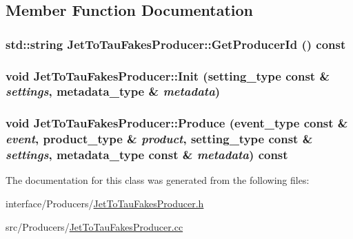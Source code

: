 \subsection{Member Function Documentation}
\hypertarget{classJetToTauFakesProducer_ae37ef82941c16b6b9dd5d8877c3da52e}{
\subsubsection[{GetProducerId}]{\setlength{\rightskip}{0pt plus 5cm}std::string JetToTauFakesProducer::GetProducerId () const}}
\label{classJetToTauFakesProducer_ae37ef82941c16b6b9dd5d8877c3da52e}
\hypertarget{classJetToTauFakesProducer_aee845c60005d5f266e75223e7ba48d0d}{
\subsubsection[{Init}]{\setlength{\rightskip}{0pt plus 5cm}void JetToTauFakesProducer::Init (setting\_\-type const \& {\em settings}, \/  metadata\_\-type \& {\em metadata})}}
\label{classJetToTauFakesProducer_aee845c60005d5f266e75223e7ba48d0d}
\hypertarget{classJetToTauFakesProducer_a15c8ffdd745fe71abbf163536b8b231e}{
\subsubsection[{Produce}]{\setlength{\rightskip}{0pt plus 5cm}void JetToTauFakesProducer::Produce (event\_\-type const \& {\em event}, \/  product\_\-type \& {\em product}, \/  setting\_\-type const \& {\em settings}, \/  metadata\_\-type const \& {\em metadata}) const}}
\label{classJetToTauFakesProducer_a15c8ffdd745fe71abbf163536b8b231e}


The documentation for this class was generated from the following files:\begin{DoxyCompactItemize}
\item 
interface/Producers/\hyperlink{JetToTauFakesProducer_8h}{JetToTauFakesProducer.h}\item 
src/Producers/\hyperlink{JetToTauFakesProducer_8cc}{JetToTauFakesProducer.cc}\end{DoxyCompactItemize}
